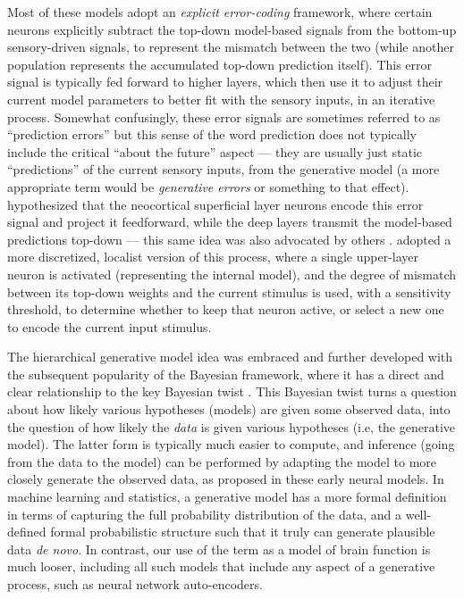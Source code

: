 \documentclass[11pt,twoside]{article}
\newif\myifpdf
\begin{document}
Most of these models \cite{Mumford92,KawatoHayakawaInui93,DayanHintonNealEtAl95,RaoBallard99} adopt an {\em explicit error-coding} framework, where certain neurons explicitly subtract the top-down model-based signals from the bottom-up sensory-driven signals, to represent the mismatch between the two (while another population represents the accumulated top-down prediction itself).  This error signal is typically fed forward to higher layers, which then use it to adjust their current model parameters to better fit with the sensory inputs, in an iterative process.  Somewhat confusingly, these error signals are sometimes referred to as ``prediction errors'' but this sense of the word prediction does not typically include the critical ``about the future'' aspect --- they are usually just static ``predictions'' of the current sensory inputs, from the generative model (a more appropriate term would be {\em generative errors} or something to that effect).   hypothesized that the neocortical superficial layer neurons encode this error signal and project it feedforward, while the deep layers transmit the model-based predictions top-down --- this same idea was also advocated by others \cite{RaoBallard99,KawatoHayakawaInui93}.   adopted a more discretized, localist version of this process, where a single upper-layer neuron is activated (representing the internal model), and the degree of mismatch between its top-down weights and the current stimulus is used, with a sensitivity threshold, to determine whether to keep that neuron active, or select a new one to encode the current input stimulus.  

The hierarchical generative model idea was embraced and further developed with the subsequent popularity of the Bayesian framework, where it has a direct and clear relationship to the key Bayesian twist  \cite[e.g.,]{LeeMumford03,Friston05,YuilleKersten06,Friston08,Friston10,Lee15}.  This Bayesian twist turns a question about how likely various hypotheses (models) are given some observed data, into the question of how likely the {\em data} is given various hypotheses (i.e, the generative model).  The latter form is typically much easier to compute, and inference (going from the data to the model) can be performed by adapting the model to more closely generate the observed data, as proposed in these early neural models.  In machine learning and statistics, a generative model has a more formal definition in terms of capturing the full probability distribution of the data, and a well-defined formal probabilistic structure such that it truly can generate plausible data {\em de novo}.  In contrast, our use of the term as a model of brain function is much looser, including all such models that include any aspect of a generative process, such as neural network auto-encoders.
\end{document}
